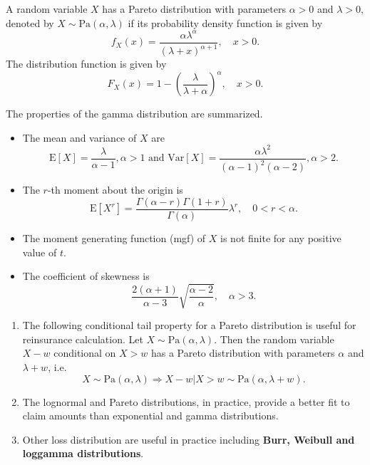 \documentclass[
]{book}
\theoremstyle{definition}
\theoremstyle{definition}
\theoremstyle{definition}
\theoremstyle{definition}
\theoremstyle{remark}
\begin{document}
A random variable \(X\) has a Pareto distribution with parameters
\(\alpha > 0\) and \(\lambda > 0\), denoted by
\(X \sim \text{Pa}(\alpha, \lambda)\) if its probability density function
is given by
\[f_X(x) = \frac{\alpha \lambda^\alpha}{(\lambda + x)^{\alpha + 1}}, \quad x > 0.\]
The distribution function is given by
\[F_X(x) = 1 - \left(  \frac{\lambda}{\lambda + \alpha} \right)^\alpha, \quad x > 0.\]

The properties of the gamma distribution are summarized.

\begin{itemize}
\item
  The mean and variance of \(X\) are
  \[\mathrm{E}[X] = \frac{\lambda}{\alpha - 1}, \alpha > 1 \text{ and } \mathrm{Var}[X] = \frac{\alpha \lambda^2}{(\alpha - 1)^2(\alpha - 2)}, \alpha > 2.\]
\item
  The \(r\)-th moment about the origin is
  \[\mathrm{E}[X^r] =\frac{\Gamma(\alpha-r) \Gamma(1+ r)}{\Gamma(\alpha)} \lambda^r, \quad 0 < r < \alpha.\]
\item
  The moment generating function (mgf) of \(X\) is not finite for any
  positive value of \(t\).
\item
  The coefficient of skewness is
  \[\frac{2(\alpha + 1)}{\alpha - 3} \sqrt{\frac{\alpha-2}{\alpha}} , \quad \alpha > 3.\]
\end{itemize}

\begin{enumerate}
\def\labelenumi{\arabic{enumi}.}
\item
  The following conditional tail property for a Pareto distribution is
  useful for reinsurance calculation. Let
  \(X \sim \text{Pa}(\alpha, \lambda)\). Then the random variable
  \(X - w\) conditional on \(X > w\) has a Pareto distribution with
  parameters \(\alpha\) and \(\lambda + w\), i.e.
  \[X \sim \text{Pa}(\alpha, \lambda)\Rightarrow  X - w | X > w \sim \text{Pa}(\alpha,\lambda + w).\]
\item
  The lognormal and Pareto distributions, in practice, provide a
  better fit to claim amounts than exponential and gamma
  distributions.
\item
  Other loss distribution are useful in practice including \textbf{Burr,
  Weibull and loggamma distributions}.
\end{enumerate}
\end{document}
